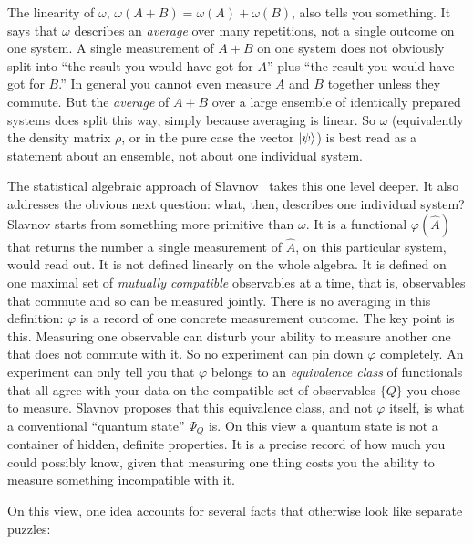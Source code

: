 The linearity of $\omega$, $\omega(A+B)=\omega(A)+\omega(B)$, also tells you something. It says that $\omega$
describes an \emph{average} over many repetitions, not a single outcome on one system. A single measurement
of $A+B$ on one system does not obviously split into ``the result you would have got for $A$'' plus ``the
result you would have got for $B$.'' In general you cannot even measure $A$ and $B$ together unless they
commute. But the \emph{average} of $A+B$ over a large ensemble of identically prepared systems does split
this way, simply because averaging is linear. So $\omega$ (equivalently the density matrix $\rho$, or in the
pure case the vector $\ket\psi$) is best read as a statement about an ensemble, not about one individual
system.

The statistical algebraic approach of Slavnov~\cite{Slavnov2001} takes this one level deeper. It also
addresses the obvious next question: what, then, describes one individual system? Slavnov starts from
something more primitive than $\omega$. It is a functional $\varphi(\hat A)$ that returns the number a single
measurement of $\hat A$, on this particular system, would read out. It is not defined linearly on the whole
algebra. It is defined on one maximal set of \emph{mutually compatible} observables at a time, that is,
observables that commute and so can be measured jointly. There is no averaging in this definition: $\varphi$
is a record of one concrete measurement outcome. The key point is this. Measuring one observable can disturb
your ability to measure another one that does not commute with it. So no experiment can pin down $\varphi$
completely. An experiment can only tell you that $\varphi$ belongs to an \emph{equivalence class} of
functionals that all agree with your data on the compatible set of observables $\{Q\}$ you chose to measure.
Slavnov proposes that this equivalence class, and not $\varphi$ itself, is what a conventional ``quantum
state'' $\Psi_Q$ is. On this view a quantum state is not a container of hidden, definite properties. It is a
precise record of how much you could possibly know, given that measuring one thing costs you the ability to
measure something incompatible with it.

On this view, one idea accounts for several facts that otherwise look like separate puzzles:

